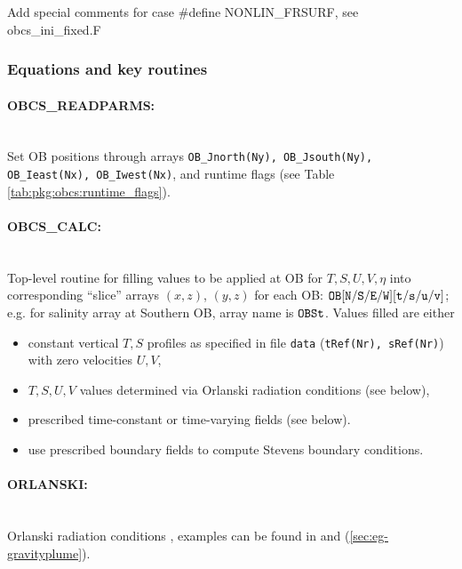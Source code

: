 \noindent
\textsf{Add special comments for case \#define NONLIN\_FRSURF,
see obcs\_ini\_fixed.F}


\subsubsection{Equations and key routines
\label{sec:pkg:obcs:equations}}

\paragraph{OBCS\_READPARMS:} ~ \\
Set OB positions through arrays
{\tt OB\_Jnorth(Ny), OB\_Jsouth(Ny), OB\_Ieast(Nx), OB\_Iwest(Nx)},
and runtime flags (see Table \ref{tab:pkg:obcs:runtime_flags}).

\paragraph{OBCS\_CALC:} ~ \\
%
Top-level routine for filling values to be applied at OB for 
$T,S,U,V,\eta$ into corresponding 
``slice'' arrays $(x,z)$, $(y,z)$ for each OB:
$\tt OB[N/S/E/W][t/s/u/v]$; e.g. for salinity array at
Southern OB, array name is $\tt OBSt$.
Values filled are either
%
\begin{itemize}
%
\item
constant vertical $T,S$ profiles as specified in file
{\tt data} ({\tt tRef(Nr), sRef(Nr)}) with zero velocities $U,V$,
%
\item
$T,S,U,V$ values determined via Orlanski radiation conditions
(see below),
%
\item
prescribed time-constant or time-varying fields (see below).
%
\item 
use prescribed boundary fields to compute Stevens boundary conditions.
\end{itemize}

\paragraph{ORLANSKI:} ~ \\
%
Orlanski radiation conditions \citep{orl:76}, examples can be found in
 and
(\ref{sec:eg-gravityplume}).

